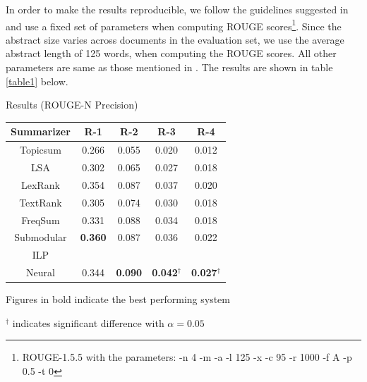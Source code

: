 In order to make the results reproducible, we follow the guidelines suggested in \cite{hong2014repository} and use a fixed set of parameters when computing ROUGE scores\footnote{ROUGE-1.5.5 with the parameters: -n 4 -m -a -l 125 -x -c 95 -r 1000 -f A -p 0.5 -t 0}. Since the abstract size varies across documents in the evaluation set, we use the average abstract length of 125 words, when computing the ROUGE scores. All other parameters are same as those mentioned in \cite{hong2014repository}.  The results are shown in table \ref{table1} below.\\
\vspace{-3mm}
\begin{center}
	\begin{threeparttable}[H]
	\centering
	\caption{Results (ROUGE-N Precision)}
	\begin{tabular}{|c|c|c|c|c|}
		\hline
		Summarizer &      R-1       &      R-2       &           R-3            &           R-4            \\ \hline
		 Topicsum  &     0.266      &     0.055      &          0.020           &          0.012           \\
		   LSA     &     0.302      &     0.065      &          0.027           &          0.018           \\
		 LexRank   &     0.354      &     0.087      &          0.037           &          0.020           \\
		 TextRank  &     0.305      &     0.074      &          0.030           &          0.018           \\
		 FreqSum   &     0.331      &     0.088      &          0.034           &          0.018           \\
		Submodular & \textbf{0.360} &     0.087      &          0.036           &          0.022           \\
		   ILP     &                &                &                          &  \\
		  Neural   &     0.344      & \textbf{0.090} & \textbf{0.042}$^\dagger$ & \textbf{0.027}$^\dagger$ \\ \hline
	\end{tabular}
	\begin{tablenotes}
	\small
	\item Figures in bold indicate the best performing system
	\item ${^\dagger}$ indicates significant difference with $\alpha=0.05$\\
	\end{tablenotes}
\label{table1}

\end{threeparttable}
\end{center}

